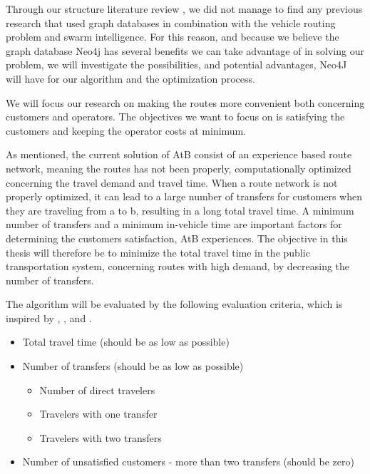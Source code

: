 Through our structure literature review%
, we did not manage to find any previous research that used graph databases in combination with the vehicle routing problem and swarm intelligence.
For this reason, and because we believe the graph database Neo4j \citep{website:neo4j} has several benefits we can take advantage of in solving our problem, %
we will investigate the possibilities, and potential advantages, Neo4J will have for our algorithm and the optimization process. 
\par
We will focus our research on making the routes more convenient both concerning customers and operators. The objectives we want to focus on is satisfying the customers and keeping the operator costs at minimum. 
\par
As mentioned, %
the current solution of AtB \citep{website:atb} consist of an experience based route network, meaning the routes has not been properly, computationally optimized concerning the travel demand and travel time. When a route network is not properly optimized, it can lead to a large number of transfers for customers when they are traveling from a to b, resulting in a long total travel time. A minimum number of transfers and a minimum in-vehicle time are important factors for determining the customers satisfaction, AtB experiences. The objective in this thesis will therefore be to minimize the total travel time in the public transportation system, concerning routes with high demand, by decreasing the number of transfers. %

The algorithm will be evaluated by the following evaluation criteria, which is inspired by \citep{kechagiopoulos14}, \citep{mandl80}, \citep{nikolic14} and \citep{fan09}.
\begin{itemize}
\item Total travel time (should be as low as possible)
\item Number of transfers (should be as low as possible)
\begin{itemize}
\item Number of direct travelers 
\item Travelers with one transfer
\item Travelers with two transfers
\end{itemize}
\item Number of unsatisfied customers - more than two transfers (should be zero)
\end{itemize}

